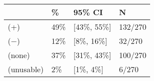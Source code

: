 \begin{tabular}{llll}
\hline
 & \% & 95\% CI  & N \\
\hline
(+) & 49\% & [43\%, 55\%] & 132/270\\
($-$) & 12\% & [8\%, 16\%] & 32/270\\
(none) & 37\% & [31\%, 43\%] & 100/270\\
(unusable) & 2\% & [1\%, 4\%] & 6/270\\
\hline
\end{tabular}
